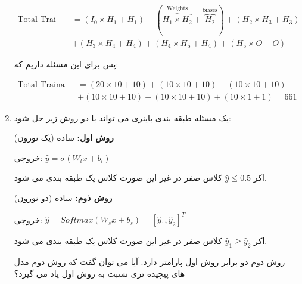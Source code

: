 \begin{enumerate}
{	      \begin{qsolve}[]
		      \begin{latin}
				\small
			      \begin{align*}
				      \text{Total Trainable Parameters} & = (I_0 \times H_1 + H_1) + (\overbrace{H_1 \times H_2}^{\text{Weights}} + \overbrace{H_2}^{\text{biases}}) + (H_2 \times H_3 + H_3) \\
				                                        & + (H_3 \times H_4 + H_4) + (H_4 \times H_5 + H_4) + (H_5 \times O + O)
			      \end{align*}
		      \end{latin}
		      \vspace*{-0.8em}
			  پس برای این مسئله داریم که:
		      \vspace*{-1.2em}
		      \begin{latin}
				\small
			      \begin{align*}
				      \text{Total Trainable Parameters} & = (20 \times 10 + 10) + (10 \times 10 + 10) + (10 \times 10 + 10) \\
				                                        & + (10 \times 10 + 10) + (10 \times 10 + 10) + (10 \times 1 + 1) = 661
			      \end{align*}
		      \end{latin}

	      \end{qsolve}
	      }
	\item {
	      یک مسئله طبقه بندی باینری می تواند با دو روش زیر حل شود:

	      \textbf{روش اول: }  ساده (یک نورون)

	      \hspace*{2em}
	      خروجی: $\hat{y}=\sigma(W_lx+b_l)$

	      \hspace*{2em}
	      اکر $\hat{y}\leq 0.5$ کلاس صفر در غیر این صورت کلاس یک طبقه بندی می شود.

	      \textbf{روش ذوم: }  ساده (دو نورون)

	      \hspace*{2em}
	      خروجی: $\hat{y}=Softmax(W_sx+b_s)=[\hat{y}_1,\hat{y}_2]^T$

	      \hspace*{2em}
	      اکر $\hat{y}_1\geq\hat{y}_2$ کلاس صفر در غیر این صورت کلاس یک طبقه بندی می شود.

	      روش دوم دو برابر روش اول پارامتر دارد. آیا می توان گفت که روش دوم مدل های پیچیده تری
	      نسبت به روش اول یاد می گیرد؟

}
\end{enumerate}
